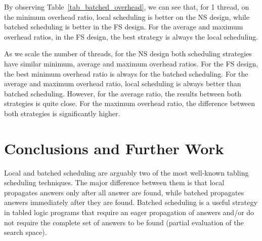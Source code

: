 \documentclass{llncs}
\begin{document}
By observing Table~\ref{tab_batched_overhead}, we can see that, for 1
thread, on the minimum overhead ratio, local scheduling is better on
the NS design, while batched scheduling is better in the FS
design. For the average and maximum overhead ratios, in the FS design,
the best strategy is always the local scheduling.   

As we scale the number of threads, for the NS design both scheduling
strategies have similar minimum, average and maximum overhead
ratios. For the FS design, the best minimum overhead ratio is always
for the batched scheduling. For the average and maximum overhead
ratio, local scheduling is always better than batched
scheduling. However, for the average ratio, the results between both
strategies is quite close. For the maximum overhead ratio, the
difference between both strategies is significantly higher. 



\section{Conclusions and Further Work}

Local and batched scheduling are arguably two of the most well-known
tabling scheduling techniques. The major difference between them is
that local propagates answers only after all answer are found, while
batched propagates answers immediately after they are found. Batched
scheduling is a useful strategy in tabled logic programs that require
an eager propagation of answers and/or do not require the complete set
of answers to be found (partial evaluation of the search space). 
\end{document}
